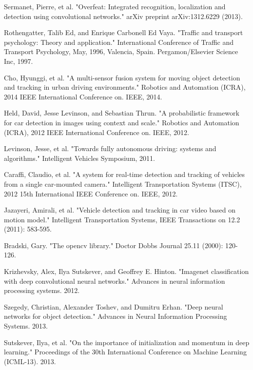 \documentclass[journal]{IEEEtran}
\begin{document}
\begin{thebibliography}{1}

Sermanet, Pierre, et al. "Overfeat: Integrated recognition, localization and detection using convolutional networks." arXiv preprint arXiv:1312.6229 (2013).

Rothengatter, Talib Ed, and Enrique Carbonell Ed Vaya. "Traffic and transport psychology: Theory and application." International Conference of Traffic and Transport Psychology, May, 1996, Valencia, Spain. Pergamon/Elsevier Science Inc, 1997.

Cho, Hyunggi, et al. "A multi-sensor fusion system for moving object detection and tracking in urban driving environments." Robotics and Automation (ICRA), 2014 IEEE International Conference on. IEEE, 2014.

Held, David, Jesse Levinson, and Sebastian Thrun. "A probabilistic framework for car detection in images using context and scale." Robotics and Automation (ICRA), 2012 IEEE International Conference on. IEEE, 2012.

Levinson, Jesse, et al. "Towards fully autonomous driving: systems and algorithms." Intelligent Vehicles Symposium, 2011.


Caraffi, Claudio, et al. "A system for real-time detection and tracking of vehicles from a single car-mounted camera." Intelligent Transportation Systems (ITSC), 2012 15th International IEEE Conference on. IEEE, 2012.

Jazayeri, Amirali, et al. "Vehicle detection and tracking in car video based on motion model." Intelligent Transportation Systems, IEEE Transactions on 12.2 (2011): 583-595.

Bradski, Gary. "The opencv library." Doctor Dobbs Journal 25.11 (2000): 120-126.

Krizhevsky, Alex, Ilya Sutskever, and Geoffrey E. Hinton. "Imagenet classification with deep convolutional neural networks." Advances in neural information processing systems. 2012.

Szegedy, Christian, Alexander Toshev, and Dumitru Erhan. "Deep neural networks for object detection." Advances in Neural Information Processing Systems. 2013.

Sutskever, Ilya, et al. "On the importance of initialization and momentum in deep learning." Proceedings of the 30th International Conference on Machine Learning (ICML-13). 2013.


\end{thebibliography}
\end{document}
